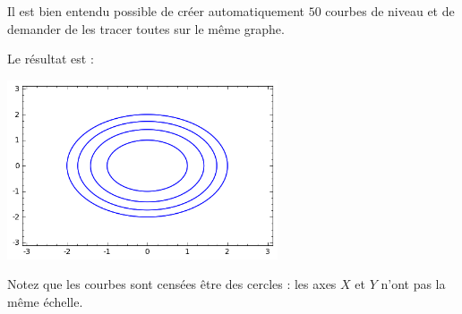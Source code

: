 Il est bien entendu possible de créer automatiquement $50$ courbes de niveau et de demander de les tracer toutes sur le même graphe.


Le résultat est :

\begin{center}
        \includegraphics[width=8cm]{pictures_bitmap/niveauCercles.png}
\end{center}
Notez que les courbes sont censées être des cercles : les axes $X$ et $Y$ n'ont pas la même échelle.


